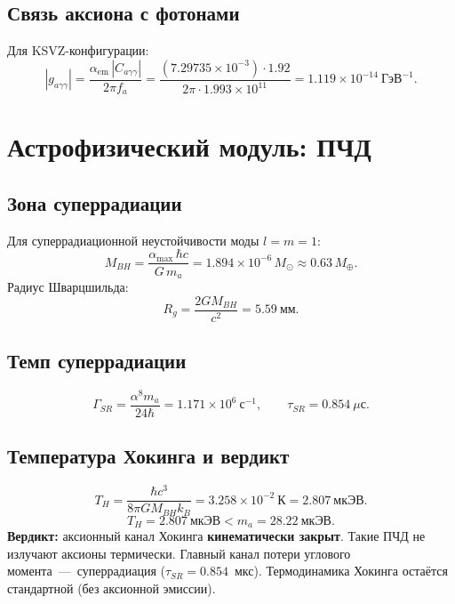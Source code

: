\documentclass[12pt,a4paper]{article}
\numberwithin{equation}{section}
\begin{document}
\subsection{Связь аксиона с фотонами}
Для KSVZ-конфигурации:
\begin{equation}
|g_{a\gamma\gamma}| = \frac{\alpha_{\text{em}}\,|C_{a\gamma\gamma}|}
{2\pi f_a} 
= \frac{(7.29735\times 10^{-3})\cdot 1.92}
{2\pi\cdot 1.993\times 10^{11}} 
= 1.119\times 10^{-14}~\text{ГэВ}^{-1}.
\label{eq:gagg}
\end{equation}

\section{Астрофизический модуль: ПЧД}

\subsection{Зона суперрадиации}
Для суперрадиационной неустойчивости моды $l=m=1$:
\begin{equation}
M_{BH} = \frac{\alpha_{\max}\,\hbar c}{G\,m_a} 
= 1.894\times 10^{-6}\,M_\odot \approx 0.63\,M_\oplus.
\end{equation}
Радиус Шварцшильда:
\begin{equation}
R_g = \frac{2GM_{BH}}{c^2} = 5.59~\text{мм}.
\end{equation}

\subsection{Темп суперрадиации}
\begin{equation}
\Gamma_{SR} = \frac{\alpha^8 m_a}{24\hbar} = 1.171\times 10^{6}~\text{с}^{-1},
\qquad \tau_{SR} = 0.854~\mu\text{с}.
\end{equation}

\subsection{Температура Хокинга и вердикт}
\begin{equation}
T_H = \frac{\hbar c^3}{8\pi G M_{BH} k_B} 
= 3.258\times 10^{-2}~\text{К} = 2.807~\text{мкЭВ}.
\end{equation}
\begin{equation}
\boxed{\;T_H = 2.807~\text{мкЭВ} < m_a = 28.22~\text{мкЭВ}.\;}
\end{equation}
\textbf{Вердикт:} аксионный канал Хокинга \textbf{кинематически закрыт}. 
Такие ПЧД не излучают аксионы термически. Главный канал потери 
углового момента~---~суперрадиация ($\tau_{SR} = 0.854$~мкс). 
Термодинамика Хокинга остаётся стандартной (без аксионной эмиссии).
\end{document}

